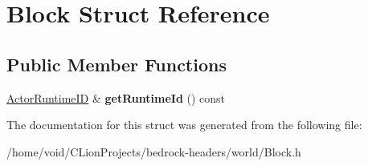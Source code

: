 \hypertarget{struct_block}{}\section{Block Struct Reference}
\label{struct_block}
\subsection*{Public Member Functions}
\begin{DoxyCompactItemize}
\item 
\mbox{\label{struct_block_a9e26b1ff0c4705f235d17589efec756d}} 
\mbox{\hyperlink{struct_actor_runtime_i_d}{Actor\+Runtime\+ID}} \& {\bfseries get\+Runtime\+Id} () const
\end{DoxyCompactItemize}


The documentation for this struct was generated from the following file\+:\begin{DoxyCompactItemize}
\item 
/home/void/\+C\+Lion\+Projects/bedrock-\/headers/world/Block.\+h\end{DoxyCompactItemize}
